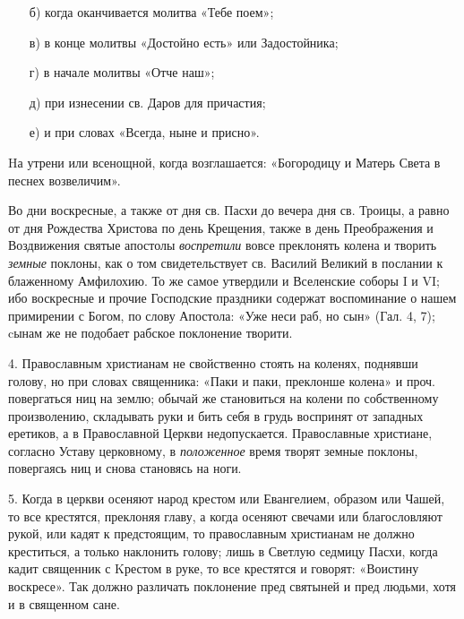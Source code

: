 \begin{mymulticols}
\begin{enumerate}
\item[б)] когда оканчивается молитва «Тебе поем»; 

\item[в)] в конце молитвы «Достойно есть» или Задостойника;

\item[г)] в начале молитвы «Отче наш»;

\item[д)] при изнесении св. Даров для причастия;

\item[е)] и при словах «Всегда, ныне и присно». 


\end{enumerate}


Hа утрени или всенощной, когда возглашается: «Богородицу и Матерь Света в песнех возвеличим». 



Во дни воскресные, а также от дня св. Пасхи до вечера дня св. Троицы, а равно от дня Рождества Христова по день Крещения, также в день Преображения и Воздвижения святые апостолы \emph{ воспретили} вовсе преклонять колена и творить \emph{ земные} поклоны, как о том свидетельствует св. Василий Великий в послании к блаженному Амфилохию. То же самое утвердили и Вселенские соборы I и VI; ибо воскресные и прочие Господские праздники содержат воспоминание о нашем примирении с Богом, по слову Апостола: «Уже неси раб, но сын» (Гал. 4, 7); cынам же не подобает рабское поклонение творити. 



4. Православным христианам не свойственно стоять на коленях, поднявши голову, но при словах священника: «Паки и паки, преклонше колена» и проч. повергаться ниц на землю; обычай же становиться на колени по собственному произволению, складывать руки и бить себя в грудь воспринят от западных еретиков, а в Православной Церкви недопускается. Православные христиане, согласно Уставу церковному, в \emph{ положенное} время творят земные поклоны, повергаясь ниц и снова становясь на ноги. 



5. Когда в церкви осеняют народ крестом или Евангелием, образом или Чашей, то все крестятся, преклоняя главу, а когда осеняют свечами или благословляют рукой, или кадят к предстоящим, то православным христианам не должно креститься, а только наклонить голову; лишь в Светлую седмицу Пасхи, когда кадит священник с Kрестом в руке, то все крестятся и говорят: «Воистину воскресе». Так должно различать поклонение пред святыней и пред людьми, хотя и в священном сане. 




\end{mymulticols}
